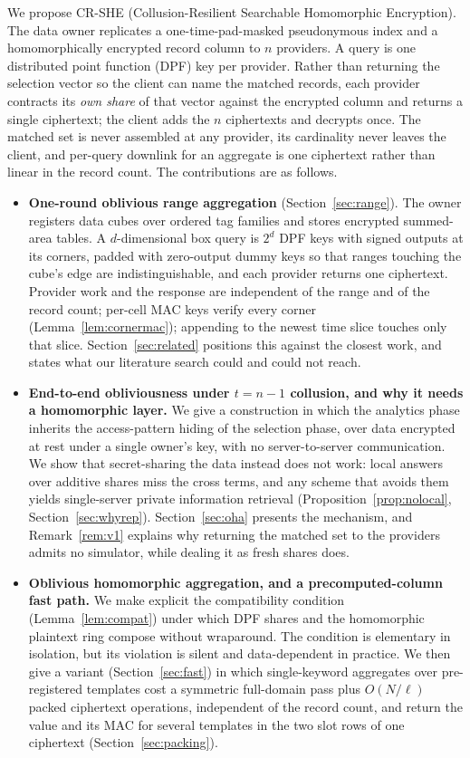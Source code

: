 \documentclass[a4paper,fleqn]{cas-sc}
\begin{document}
We propose CR-SHE (Collusion-Resilient Searchable Homomorphic Encryption). The
data owner replicates a one-time-pad-masked pseudonymous index and a
homomorphically encrypted record column to $n$ providers. A query is one
distributed point function (DPF) key per provider. Rather than returning the
selection vector so the client can name the matched records, each provider
contracts its \emph{own share} of that vector against the encrypted column and
returns a single ciphertext; the client adds the $n$ ciphertexts and decrypts
once. The matched set is never assembled at any provider, its cardinality
never leaves the client, and per-query downlink for an aggregate is one
ciphertext rather than linear in the record count. The contributions are as
follows.

\begin{itemize}
\item \textbf{One-round oblivious range aggregation} (Section~\ref{sec:range}).
The owner registers data cubes over ordered tag families and stores encrypted
summed-area tables. A $d$-dimensional box query is $2^d$ DPF keys with signed
outputs at its corners, padded with zero-output dummy keys so that ranges
touching the cube's edge are indistinguishable, and each provider returns one
ciphertext. Provider work and the response are independent of the range and of
the record count; per-cell MAC keys verify every corner
(Lemma~\ref{lem:cornermac}); appending to the newest time slice touches only
that slice. Section~\ref{sec:related} positions this against the closest work,
and states what our literature search could and could not reach.

\item \textbf{End-to-end obliviousness under $t=n-1$ collusion, and why it
needs a homomorphic layer.} We give a construction in which the analytics
phase inherits the access-pattern hiding of the selection phase, over data
encrypted at rest under a single owner's key, with no server-to-server
communication. We show that secret-sharing the data instead does not work:
local answers over additive shares miss the cross terms, and any scheme that
avoids them yields single-server private information retrieval
(Proposition~\ref{prop:nolocal}, Section~\ref{sec:whyrep}).
Section~\ref{sec:oha} presents the mechanism, and Remark~\ref{rem:v1}
explains why returning the matched set to the providers admits no simulator,
while dealing it as fresh shares does.

\item \textbf{Oblivious homomorphic aggregation, and a precomputed-column fast
path.} We make explicit the compatibility condition (Lemma~\ref{lem:compat})
under which DPF shares and the homomorphic plaintext ring compose without
wraparound. The condition is elementary in isolation, but its violation is
silent and data-dependent in practice. We then give a variant
(Section~\ref{sec:fast}) in which single-keyword aggregates over pre-registered
templates cost a symmetric full-domain pass plus $O(N/\ell)$ packed ciphertext
operations, independent of the record count, and return the value and its MAC
for several templates in the two slot rows of one ciphertext
(Section~\ref{sec:packing}).


\end{itemize}
\end{document}
